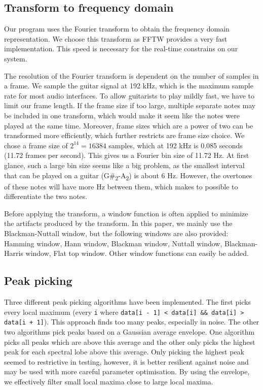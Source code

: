 \documentclass[10pt,twocolumn]{article}
\begin{document}
\subsection{Transform to frequency domain}  \label{sub:four}
Our program uses the Fourier transform to obtain the frequency domain representation. We choose this transform as FFTW provides a very fast implementation. This speed is necessary for the real-time constrains on our system.

The resolution of the Fourier transform is dependent on the number of samples in a frame. We sample the guitar signal at 192 kHz, which is the maximum sample rate for most audio interfaces. To allow guitarists to play mildly fast, we have to limit our frame length. If the frame size if too large, multiple separate notes may be included in one transform, which would make it seem like the notes were played at the same time. Moreover, frame sizes which are a power of two can be transformed more efficiently, which further restricts are frame size choice. We chose a frame size of $2^{14} = 16384$ samples, which at 192 kHz is 0.085 seconds (11.72 frames per second). This gives us a Fourier bin size of 11.72 Hz. At first glance, such a large bin size seems like a big problem, as the smallest interval that can be played on a guitar (G\#\textsubscript{2}-A\textsubscript{2}) is about 6 Hz. However, the overtones of these notes will have more Hz between them, which makes to possible to differentiate the two notes.%

Before applying the transform, a window function is often applied to minimize the artifacts produced by the transform. In this paper, we mainly use the Blackman-Nuttall window, but the following windows are also provided: Hamming window, Hann window, Blackman window, Nuttall window, Blackman-Harris window, Flat top window. Other window functions can easily be added.

\subsection{Peak picking} \label{sub:peak}
Three different peak picking algorithms have been implemented. The first picks every local maximum (every \texttt{i} where \texttt{data[i - 1] < data[i] \&\& data[i] > data[i + 1]}). This approach finds too many peaks, especially in noise. The other two algorithms pick peaks based on a Gaussian average envelope. One algorithm picks all peaks which are above this average and the other only picks the highest peak for each spectral lobe above this average. Only picking the highest peak seemed to restrictive in testing, however, it is better resilient against noise and may be used with more careful parameter optimisation. By using the envelope, we effectively filter small local maxima close to large local maxima.
\end{document}
